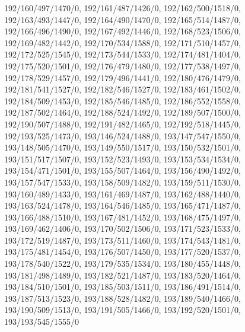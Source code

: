 {192/160/497/1470/0,%
192/161/487/1426/0,%
192/162/500/1518/0,%
192/163/493/1447/0,%
192/164/490/1470/0,%
192/165/514/1487/0,%
192/166/496/1490/0,%
192/167/492/1446/0,%
192/168/523/1506/0,%
192/169/482/1442/0,%
192/170/534/1588/0,%
192/171/510/1457/0,%
192/172/525/1545/0,%
192/173/544/1533/0,%
192/174/481/1404/0,%
192/175/520/1501/0,%
192/176/479/1480/0,%
192/177/538/1497/0,%
192/178/529/1457/0,%
192/179/496/1441/0,%
192/180/476/1479/0,%
192/181/541/1527/0,%
192/182/546/1527/0,%
192/183/461/1502/0,%
192/184/509/1453/0,%
192/185/546/1485/0,%
192/186/552/1558/0,%
192/187/502/1464/0,%
192/188/524/1492/0,%
192/189/507/1500/0,%
192/190/507/1488/0,%
192/191/482/1465/0,%
192/192/518/1445/0,%
192/193/525/1473/0,%
193/146/524/1488/0,%
193/147/547/1550/0,%
193/148/505/1470/0,%
193/149/550/1517/0,%
193/150/532/1501/0,%
193/151/517/1507/0,%
193/152/523/1493/0,%
193/153/534/1534/0,%
193/154/471/1501/0,%
193/155/507/1464/0,%
193/156/490/1492/0,%
193/157/547/1533/0,%
193/158/509/1482/0,%
193/159/511/1530/0,%
193/160/489/1433/0,%
193/161/469/1487/0,%
193/162/488/1440/0,%
193/163/524/1478/0,%
193/164/546/1485/0,%
193/165/471/1487/0,%
193/166/488/1510/0,%
193/167/481/1452/0,%
193/168/475/1497/0,%
193/169/462/1406/0,%
193/170/502/1506/0,%
193/171/523/1533/0,%
193/172/519/1487/0,%
193/173/511/1460/0,%
193/174/543/1481/0,%
193/175/481/1454/0,%
193/176/507/1450/0,%
193/177/520/1537/0,%
193/178/540/1522/0,%
193/179/535/1534/0,%
193/180/455/1448/0,%
193/181/498/1489/0,%
193/182/521/1487/0,%
193/183/520/1464/0,%
193/184/510/1501/0,%
193/185/503/1511/0,%
193/186/491/1514/0,%
193/187/513/1523/0,%
193/188/528/1482/0,%
193/189/540/1466/0,%
193/190/509/1513/0,%
193/191/505/1466/0,%
193/192/520/1501/0,%
193/193/545/1555/0}{
	\plotpoint{\x}{\y}{\entries}{\resources}{\faults}
}
